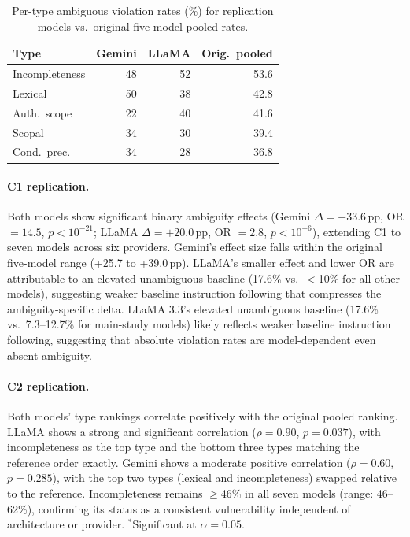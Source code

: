 \begin{table}[!ht]
\centering
\small
\caption{Per-type ambiguous violation rates (\%) for replication models vs.\ original five-model pooled rates.}
\label{tab:expansion_pertype}
\begin{tabular}{lrrr}
\toprule
Type & Gemini & LLaMA & Orig.\ pooled \\
\midrule
Incompleteness & 48 & 52 & 53.6 \\
Lexical & 50 & 38 & 42.8 \\
Auth.\ scope & 22 & 40 & 41.6 \\
Scopal & 34 & 30 & 39.4 \\
Cond.\ prec. & 34 & 28 & 36.8 \\
\bottomrule
\end{tabular}
\end{table}

\paragraph{C1 replication.} Both models show significant binary ambiguity effects (Gemini $\Delta = +33.6$\,pp, OR $= 14.5$, $p < 10^{-21}$; LLaMA $\Delta = +20.0$\,pp, OR $= 2.8$, $p < 10^{-6}$), extending C1 to seven models across six providers. Gemini's effect size falls within the original five-model range (+25.7 to +39.0\,pp). LLaMA's smaller effect and lower OR are attributable to an elevated unambiguous baseline (17.6\% vs.\ $<$10\% for all other models), suggesting weaker baseline instruction following that compresses the ambiguity-specific delta. LLaMA 3.3's elevated unambiguous baseline (17.6\% vs.\ 7.3--12.7\% for main-study models) likely reflects weaker baseline instruction following, suggesting that absolute violation rates are model-dependent even absent ambiguity.

\paragraph{C2 replication.} Both models' type rankings correlate positively with the original pooled ranking. LLaMA shows a strong and significant correlation ($\rho = 0.90$, $p = 0.037$), with incompleteness as the top type and the bottom three types matching the reference order exactly. Gemini shows a moderate positive correlation ($\rho = 0.60$, $p = 0.285$), with the top two types (lexical and incompleteness) swapped relative to the reference. Incompleteness remains $\geq$46\% in all seven models (range: 46--62\%), confirming its status as a consistent vulnerability independent of architecture or provider. $^*$Significant at $\alpha = 0.05$.

